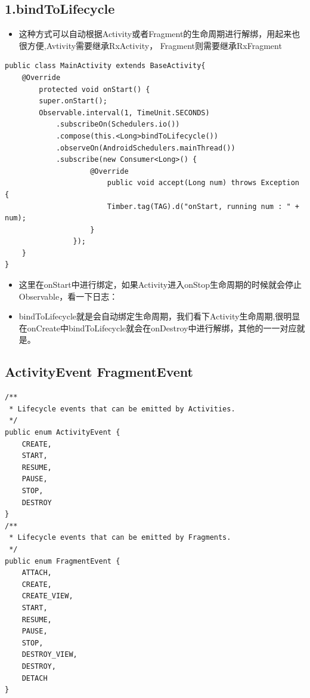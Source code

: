 \documentclass[9pt, b5paper]{article}
\begin{document}
\subsection{1.bindToLifecycle}
\label{sec-20-1}
\begin{itemize}
\item 这种方式可以自动根据Activity或者Fragment的生命周期进行解绑，用起来也很方便,Avtivity需要继承RxActivity， Fragment则需要继承RxFragment
\end{itemize}
\begin{verbatim}
public class MainActivity extends BaseActivity{
    @Override
        protected void onStart() {
        super.onStart();
        Observable.interval(1, TimeUnit.SECONDS)
            .subscribeOn(Schedulers.io())
            .compose(this.<Long>bindToLifecycle())
            .observeOn(AndroidSchedulers.mainThread())
            .subscribe(new Consumer<Long>() {
                    @Override
                        public void accept(Long num) throws Exception {
                        Timber.tag(TAG).d("onStart, running num : " + num);
                    }
                });
    }
}
\end{verbatim}
\begin{itemize}
\item 这里在onStart中进行绑定，如果Activity进入onStop生命周期的时候就会停止Observable，看一下日志：
\item bindToLifecycle就是会自动绑定生命周期，我们看下Activity生命周期,很明显在onCreate中bindToLifecycle就会在onDestroy中进行解绑，其他的一一对应就是。
\end{itemize}
\subsection{ActivityEvent FragmentEvent}
\label{sec-20-2}
\begin{verbatim}
/**
 * Lifecycle events that can be emitted by Activities.
 */
public enum ActivityEvent {
    CREATE,
    START,
    RESUME,
    PAUSE,
    STOP,
    DESTROY
}
/**
 * Lifecycle events that can be emitted by Fragments.
 */
public enum FragmentEvent {
    ATTACH,
    CREATE,
    CREATE_VIEW,
    START,
    RESUME,
    PAUSE,
    STOP,
    DESTROY_VIEW,
    DESTROY,
    DETACH
}
\end{verbatim}
\end{document}
